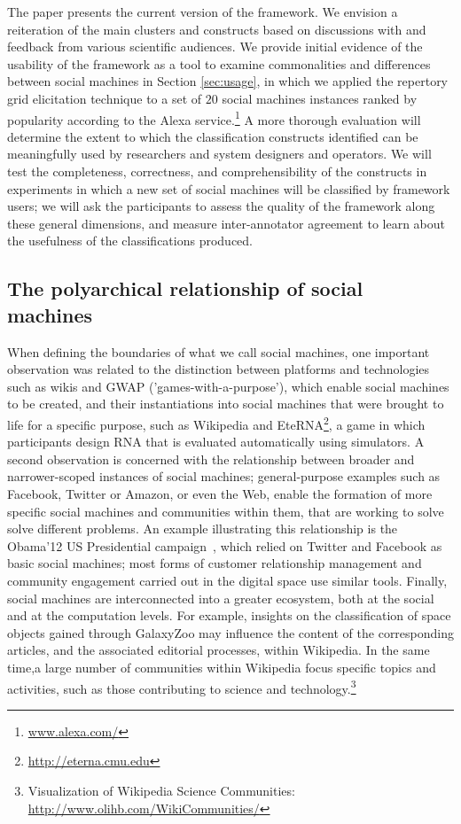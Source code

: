 \documentclass{sig-alternate}
\begin{document}
The paper presents the current version of the framework. We envision a reiteration of the main clusters and constructs based on discussions with and feedback from various scientific audiences. We provide initial evidence of the usability of the framework as a tool to  examine commonalities and differences between social machines in Section \ref{sec:usage}, in which we applied the repertory grid elicitation technique to a set of $20$ social machines instances ranked by popularity according to the Alexa service.\footnote{\url{www.alexa.com/}} A more thorough evaluation will determine the extent to which the classification constructs identified can be meaningfully used by researchers and system designers and operators. We will test the completeness, correctness, and comprehensibility of the constructs in experiments in which a new set of social machines will be classified by framework users; we will ask the participants to assess the quality of the framework along these general dimensions, and measure inter-annotator agreement to learn about the usefulness of the classifications produced.

\subsection{The polyarchical relationship of social machines}
When defining the boundaries of what we call social machines, one important observation was related to the distinction between platforms and technologies such as wikis and GWAP ('games-with-a-purpose'), which enable social machines to be created, and their instantiations into social machines that were brought to life for a specific purpose, such as Wikipedia and EteRNA\footnote{\url{http://eterna.cmu.edu}}, a game in which  participants design RNA  that is evaluated automatically using simulators. A second observation is concerned with the relationship between broader and narrower-scoped instances of social machines; general-purpose examples such as Facebook, Twitter or Amazon, or even the Web, enable the formation of more specific social machines and communities within them, that are working to solve solve different problems. An example illustrating this relationship is the Obama'12 US Presidential campaign~\cite{obamakieron}, which relied on Twitter and Facebook as basic social machines; most forms of customer relationship management and community engagement carried out in the digital space use similar tools. Finally, social machines are interconnected into a greater ecosystem, both at the social and at the computation levels. For example, insights on the classification of space objects gained through GalaxyZoo may influence the content of the corresponding articles, and the associated editorial processes, within Wikipedia. In the same time,a large number of communities within Wikipedia focus specific topics and activities, such as those contributing to science and technology.\footnote{Visualization of Wikipedia Science Communities: \url{http://www.olihb.com/WikiCommunities/}}
\end{document}
